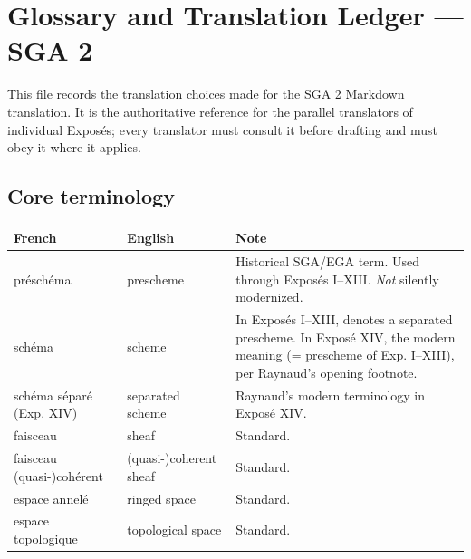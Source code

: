 \documentclass[
  11pt,
  a4paper,
]{book}
\newcounter{none} %
\begin{document}
\chapter{Glossary and Translation Ledger --- SGA
2}\label{glossary-and-translation-ledger-sga-2}

This file records the translation choices made for the SGA 2 Markdown
translation. It is the authoritative reference for the parallel
translators of individual Exposés; every translator must consult it
before drafting and must obey it where it applies.

\section{Core terminology}\label{core-terminology}

{\def\LTcaptype{none} %
\begin{longtable}[]{@{}
  >{\raggedright\arraybackslash}p{}
  >{\raggedright\arraybackslash}p{}
  >{\raggedright\arraybackslash}p{}@{}}
\toprule\noalign{}
\begin{minipage}[b]{\linewidth}\raggedright
French
\end{minipage} & \begin{minipage}[b]{\linewidth}\raggedright
English
\end{minipage} & \begin{minipage}[b]{\linewidth}\raggedright
Note
\end{minipage} \\
\midrule\noalign{}
\endhead
\bottomrule\noalign{}
\endlastfoot
préschéma & prescheme & Historical SGA/EGA term. Used through Exposés
I--XIII. \emph{Not} silently modernized. \\
schéma & scheme & In Exposés I--XIII, denotes a separated prescheme. In
Exposé XIV, the modern meaning (= prescheme of Exp. I--XIII), per
Raynaud's opening footnote. \\
schéma séparé (Exp. XIV) & separated scheme & Raynaud's modern
terminology in Exposé XIV. \\
faisceau & sheaf & Standard. \\
faisceau (quasi-)cohérent & (quasi-)coherent sheaf & Standard. \\
espace annelé & ringed space & Standard. \\
espace topologique & topological space & Standard. \\

\end{longtable}}
\end{document}
